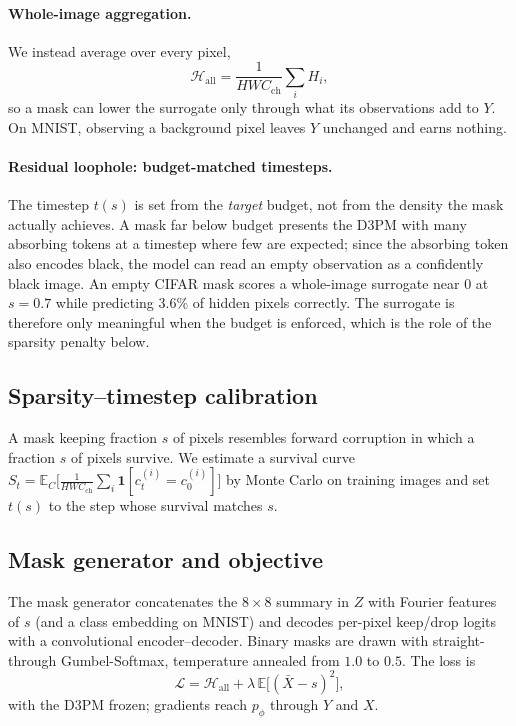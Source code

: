 \documentclass{article}
\begin{document}
\paragraph{Whole-image aggregation.}
We instead average over every pixel,
\begin{equation}
\mathcal{H}_{\mathrm{all}} = \frac{1}{HW C_{\mathrm{ch}}}\sum_i H_i,
\end{equation}
so a mask can lower the surrogate only through what its observations add to $Y$. On MNIST, observing a background pixel leaves $Y$ unchanged and earns nothing.

\paragraph{Residual loophole: budget-matched timesteps.}
The timestep $t(s)$ is set from the \emph{target} budget, not from the density the mask actually achieves. A mask far below budget presents the D3PM with many absorbing tokens at a timestep where few are expected; since the absorbing token also encodes black, the model can read an empty observation as a confidently black image. An empty CIFAR mask scores a whole-image surrogate near $0$ at $s = 0.7$ while predicting $3.6\%$ of hidden pixels correctly. The surrogate is therefore only meaningful when the budget is enforced, which is the role of the sparsity penalty below.

\subsection{Sparsity--timestep calibration}
A mask keeping fraction $s$ of pixels resembles forward corruption in which a fraction $s$ of pixels survive. We estimate a survival curve $S_t = \mathbb{E}_C\bigl[\frac{1}{HWC_{\mathrm{ch}}}\sum_i \mathbf{1}[c_t^{(i)} = c_0^{(i)}]\bigr]$ by Monte Carlo on training images and set $t(s)$ to the step whose survival matches $s$.

\subsection{Mask generator and objective}
The mask generator concatenates the $8 \times 8$ summary in $Z$ with Fourier features of $s$ (and a class embedding on MNIST) and decodes per-pixel keep/drop logits with a convolutional encoder--decoder. Binary masks are drawn with straight-through Gumbel-Softmax, temperature annealed from $1.0$ to $0.5$. The loss is
\begin{equation}
\mathcal{L} = \mathcal{H}_{\mathrm{all}} + \lambda\,\mathbb{E}\bigl[(\bar{X} - s)^2\bigr],
\end{equation}
with the D3PM frozen; gradients reach $p_\phi$ through $Y$ and $X$.
\end{document}
